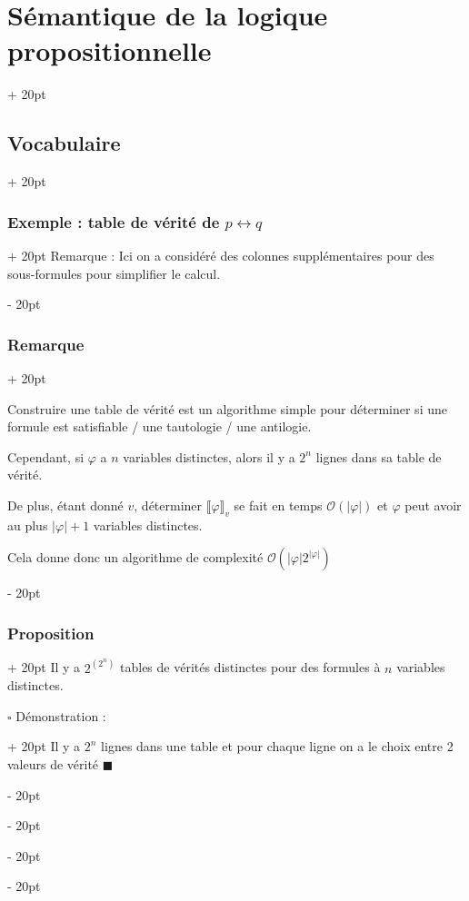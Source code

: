 \documentclass[a4paper, 12pt, twoside]{article}
\newcommand{\abs}[1]{\left\lvert #1 \right\rvert}
\newcommand{\ind}[1][20pt]{\advance\leftskip + #1}
\newcommand{\deind}[1][20pt]{\advance\leftskip - #1}
\newenvironment{indt}[2][20pt]{#2 \par \ind[#1]}{\par \deind} %
\begin{document}
\begin{indt}{\section{Sémantique de la logique propositionnelle}}
\begin{indt}{\subsection{Vocabulaire}}
\begin{indt}{\subsubsection{Exemple : table de vérité de $p \leftrightarrow q$}}
                Remarque : Ici on a considéré des colonnes supplémentaires pour des sous-formules pour simplifier le calcul.
            \end{indt}
            
            \vspace{12pt}
            
            \begin{indt}{\subsubsection{Remarque}}
                \label{3.1.8}
                
                Construire une table de vérité est un algorithme simple pour déterminer si une formule est satisfiable / une tautologie / une antilogie.
                
                Cependant, si $\varphi$ a $n$ variables distinctes, alors il y a $2^n$ lignes dans sa table de vérité.
                
                De plus, étant donné $v$, déterminer $\llbracket \varphi \rrbracket_v$ se fait en temps $\mathcal O(\abs \varphi)$ et $\varphi$ peut avoir au plus $\abs\varphi + 1$ variables distinctes.
                
                Cela donne donc un algorithme de complexité $\mathcal O(\abs\varphi 2^{\abs\varphi})$
            \end{indt}
            
            \vspace{12pt}
            
            \begin{indt}{\subsubsection{Proposition}}
                Il y a $2^{(2^n)}$ tables de vérités distinctes pour des formules à $n$ variables distinctes.
                
                \begin{indt}{$\square$ Démonstration :}
                    Il y a $2^n$ lignes dans une table et pour chaque ligne on a le choix entre 2 valeurs de vérité $\blacksquare$
                \end{indt}
            \end{indt}
        \end{indt}
        
        \vspace{12pt}
        

\end{indt}
\end{document}
